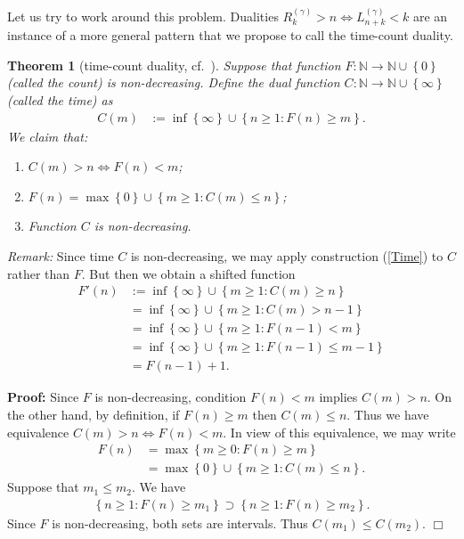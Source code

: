 \documentclass[a4paper,12pt]{article}
\newcommand{\klam}[1]{\left\{ #1 \right\}}
\newtheorem{theorem}{Theorem}
\newenvironment*{proof}{\begin{trivlist}\item[]
\noindent\textbf{Proof:}}{$\Box$\par\end{trivlist}}
\begin{document}
Let us try to work around this problem.  Dualities
$R^{(\gamma)}_k>n\iff L^{(\gamma)}_{n+k}<k$ are an instance of a more
general pattern that we propose to call the time-count duality.
\begin{theorem}[time-count duality, cf.\ \citep{WynerZiv89}]
  \label{theoTimeCount}
  Suppose that function
  $F:\mathbb{N}\rightarrow\mathbb{N}\cup\klam{0}$ (called the count)
  is non-decreasing. Define the dual function
  $C:\mathbb{N}\rightarrow\mathbb{N}\cup\klam{\infty}$ (called
  the time) as
  \begin{align}
    \label{Time}
    C(m)&:=\inf\klam{\infty}\cup\klam{n\ge 1: F(n)\ge m}.
  \end{align}
  We claim that:
  \begin{enumerate}
  \item $C(m)>n\iff F(n)<m$;    
  \item $F(n)=\max\klam{0}\cup\klam{m\ge 1: C(m)\le n}$;    
  \item Function $C$ is non-decreasing.
  \end{enumerate}
\end{theorem}
\emph{Remark:} Since time $C$ is non-decreasing, we may apply
construction (\ref{Time}) to $C$ rather than $F$. But then we obtain a
shifted function
\begin{align}
  F'(n)
  &:=\inf\klam{\infty}\cup\klam{m\ge 1: C(m)\ge n}
    \nonumber\\
  &=
  \inf\klam{\infty}\cup\klam{m\ge 1: C(m)>n-1}
    \nonumber\\
  &=
  \inf\klam{\infty}\cup\klam{m\ge 1: F(n-1)<m}
    \nonumber\\
  &=
    \inf\klam{\infty}\cup\klam{m\ge 1: F(n-1)\le m-1}
    \nonumber\\
  &=F(n-1)+1.
\end{align}
\begin{proof}
  Since $F$ is non-decreasing, condition $F(n)<m$ implies $C(m)>n$.
  On the other hand, by definition, if $F(n)\ge m$ then $C(m)\le n$.
  Thus we have equivalence $C(m)>n\iff F(n)<m$.  In view of this
  equivalence, we may write
  \begin{align}
    F(n)&=\max\klam{m\ge 0: F(n)\ge m}
    \nonumber\\
        &=\max\klam{0}\cup\klam{m\ge 1: C(m)\le n}
    .
  \end{align}
  Suppose that $m_1\le m_2$. We have
  \begin{align}
    \klam{n\ge 1: F(n)\ge m_1}\supset \klam{n\ge 1: F(n)\ge
    m_2}.
  \end{align}
  Since $F$ is non-decreasing, both sets are intervals. Thus
  $C(m_1)\le C(m_2)$.
\end{proof}
\end{document}
